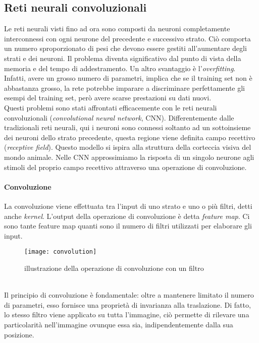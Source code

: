 \subsection{Reti neurali convoluzionali}
Le reti neurali visti fino ad ora sono composti da neuroni completamente interconnessi con ogni neurone del precedente e successivo strato. Ciò comporta un numero sproporzionato di pesi che devono essere gestiti all'aumentare degli strati e dei neuroni. Il problema diventa significativo dal punto di vista della memoria e del tempo di addestramento. Un altro svantaggio è l'\textit{overfitting}. Infatti, avere un grosso numero di parametri, implica che se il training set non è abbastanza grosso, la rete potrebbe imparare a discriminare perfettamente gli esempi del training set, però avere scarse prestazioni su dati nuovi.\\
Questi problemi sono stati affrontati efficacemente con le reti neurali convoluzionali (\textit{convolutional neural network}, CNN). Differentemente dalle tradizionali reti neurali, qui i neuroni sono connessi soltanto ad un sottoinsieme dei neuroni dello strato precedente, questa regione viene definita campo recettivo (\textit{receptive field}). Questo modello si ispira alla struttura della corteccia visiva del mondo animale. Nelle CNN approssimiamo la risposta di un singolo neurone agli stimoli del proprio campo recettivo attraverso una operazione di convoluzione.
\paragraph{Convoluzione} 
La convoluzione viene effettuata tra l'input di uno strato e uno o più filtri, detti anche \textit{kernel}. L'output della operazione di convoluzione è detta \textit{feature map}. Ci sono tante feature map quanti sono il numero di filtri utilizzati per elaborare gli input. 
\begin{figure}[ht]
    \centering
    \texttt{[image: convolution]}
    \caption[Esempio di convoluzione]{illustrazione della operazione di convoluzione con un filtro}
    \label{convolution}
\end{figure}\\
Il principio di convoluzione è fondamentale: oltre a mantenere limitato il numero di parametri, esso fornisce una proprietà di invarianza alla traslazione. Di fatto, lo stesso filtro viene applicato su tutta l'immagine, ciò permette di rilevare una particolarità nell'immagine ovunque essa sia, indipendentemente dalla sua posizione. 

